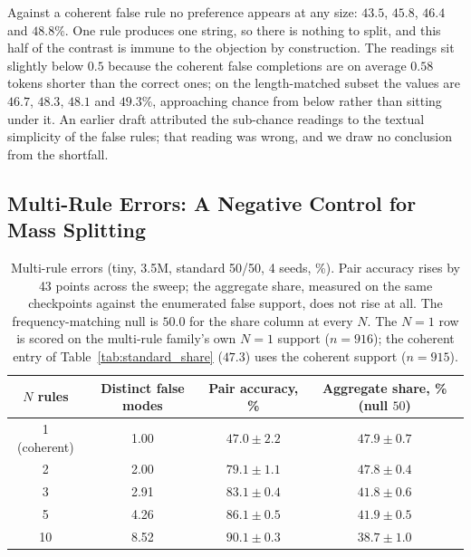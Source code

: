 \documentclass{article}
\begin{document}
Against a coherent false rule no preference appears at any size: $43.5$, $45.8$, $46.4$ and $48.8\%$. One rule produces one string, so there is nothing to split, and this half of the contrast is immune to the objection by construction. The readings sit slightly below $0.5$ because the coherent false completions are on average $0.58$ tokens shorter than the correct ones; on the length-matched subset the values are $46.7$, $48.3$, $48.1$ and $49.3\%$, approaching chance from below rather than sitting under it. An earlier draft attributed the sub-chance readings to the textual simplicity of the false rules; that reading was wrong, and we draw no conclusion from the shortfall.

\subsection{Multi-Rule Errors: A Negative Control for Mass Splitting}
\label{sec:multirule}

\begin{table}[t]
\centering
\small
\begin{tabular}{cccc}
\toprule
$N$ rules & Distinct false modes & Pair accuracy, \% & Aggregate share, \% (null $50$) \\
\midrule
1 (coherent) & 1.00 & $47.0 \pm 2.2$ & $47.9 \pm 0.7$ \\
2  & 2.00 & $79.1 \pm 1.1$ & $47.8 \pm 0.4$ \\
3  & 2.91 & $83.1 \pm 0.4$ & $41.8 \pm 0.6$ \\
5  & 4.26 & $86.1 \pm 0.5$ & $41.9 \pm 0.5$ \\
10 & 8.52 & $90.1 \pm 0.3$ & $38.7 \pm 1.0$ \\
\bottomrule
\end{tabular}
\caption{Multi-rule errors (tiny, 3.5M, standard 50/50, 4 seeds, \%). Pair accuracy rises by 43 points across the sweep; the aggregate share, measured on the same checkpoints against the enumerated false support, does not rise at all. The frequency-matching null is $50.0$ for the share column at every $N$. The $N{=}1$ row is scored on the multi-rule family's own $N{=}1$ support ($n{=}916$); the coherent entry of Table~\ref{tab:standard_share} ($47.3$) uses the coherent support ($n{=}915$).}
\label{tab:multirule}
\end{table}
\end{document}
